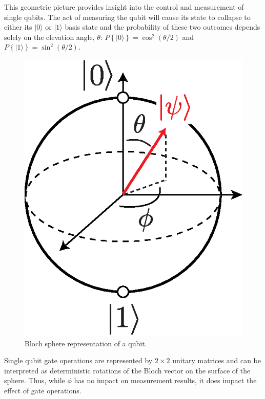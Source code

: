 \documentclass[journal]{IEEEtran}
\begin{document}
This geometric picture provides  insight into the control and measurement of single qubits. The act of measuring the qubit will cause its state to collapse to either its $|0\rangle$ or $|1\rangle$ basis state and the probability of these two outcomes depends solely on the elevation angle, $\theta$: $P\left\{|0\rangle\right\}=\cos^2\left(\theta/2\right)$ and $P\left\{|1\rangle\right\}=\sin^2\left(\theta/2\right)$. %
\begin{figure}[bt!]
\begin{center}
\includegraphics[width=0.5\columnwidth]{FIGURES/FIGURE_2}
\end{center}
\caption{Bloch sphere representation of a qubit.}\label{BS}
\end{figure}
Single qubit gate operations are represented by $2\times2$ unitary matrices and can be interpreted as deterministic rotations of the Bloch vector on the surface of the sphere. Thus, while $\phi$ has no impact on measurement results, it does impact the effect of gate operations.
\end{document}
